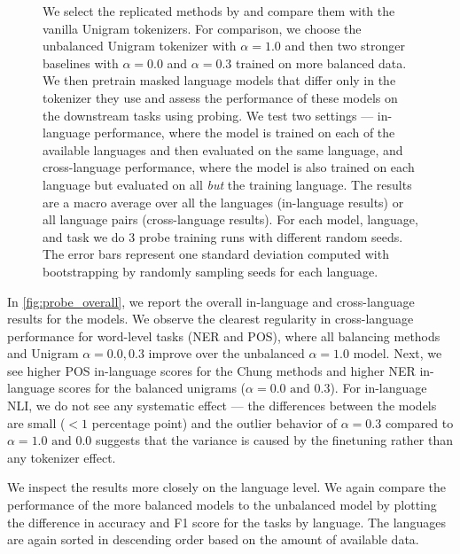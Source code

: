 \begin{figure}
    \caption{We select the replicated methods by \citet{chung_improving_2020,zheng_allocating_2021} and compare them with the vanilla Unigram tokenizers. For comparison, we choose the unbalanced Unigram tokenizer with $\alpha=1.0$ and then two stronger baselines with $\alpha=0.0$ and $\alpha=0.3$ trained on more balanced data. We then pretrain masked language models that differ only in the tokenizer they use and assess the performance of these models on the downstream tasks using probing. We test two settings --- in-language performance, where the model is trained on each of the available languages and then evaluated on the same language, and cross-language performance, where the model is also trained on each language but evaluated on all \textit{but} the training language. The results are a macro average over all the languages (in-language results) or all language pairs (cross-language results). For each model, language, and task we do 3 probe training runs with different random seeds. The error bars represent one standard deviation computed with bootstrapping by randomly sampling seeds for each language.}
    \label{fig:probe_overall}
\end{figure}

In \autoref{fig:probe_overall}, we report the overall in-language and cross-language results for the models. We observe the clearest regularity in cross-language performance for word-level tasks (NER and POS), where all balancing methods and Unigram $\alpha=0.0,0.3$ improve over the unbalanced $\alpha=1.0$ model. Next, we see higher POS in-language scores for the Chung methods and higher NER in-language scores for the balanced unigrams ($\alpha=0.0\text{ and }0.3$). For in-language NLI, we do not see any systematic effect --- the differences between the models are small ($<1$ percentage point) and the outlier behavior of $\alpha=0.3$ compared to $\alpha=1.0\text{ and }0.0$ suggests that the variance is caused by the finetuning rather than any tokenizer effect.

We inspect the results more closely on the language level. We again compare the performance of the more balanced models to the unbalanced model by plotting the difference in accuracy and F1 score for the tasks by language. The languages are again sorted in descending order based on the amount of available data. 



